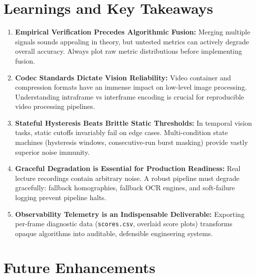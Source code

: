 \documentclass[10pt,a4paper]{article}
\begin{document}
\section{Learnings and Key Takeaways}

\begin{enumerate}[leftmargin=6mm, itemsep=2pt, topsep=2pt]
  \item \textbf{Empirical Verification Precedes Algorithmic Fusion:} Merging multiple signals sounds appealing in theory, but untested metrics can actively degrade overall accuracy. Always plot raw metric distributions before implementing fusion.
  \item \textbf{Codec Standards Dictate Vision Reliability:} Video container and compression formats have an immense impact on low-level image processing. Understanding intraframe vs interframe encoding is crucial for reproducible video processing pipelines.
  \item \textbf{Stateful Hysteresis Beats Brittle Static Thresholds:} In temporal vision tasks, static cutoffs invariably fail on edge cases. Multi-condition state machines (hysteresis windows, consecutive-run burst masking) provide vastly superior noise immunity.
  \item \textbf{Graceful Degradation is Essential for Production Readiness:} Real lecture recordings contain arbitrary noise. A robust pipeline must degrade gracefully: fallback homographies, fallback OCR engines, and soft-failure logging prevent pipeline halts.
  \item \textbf{Observability Telemetry is an Indispensable Deliverable:} Exporting per-frame diagnostic data (\texttt{scores.csv}, overlaid score plots) transforms opaque algorithms into auditable, defensible engineering systems.
\end{enumerate}

\section{Future Enhancements}
\end{document}
